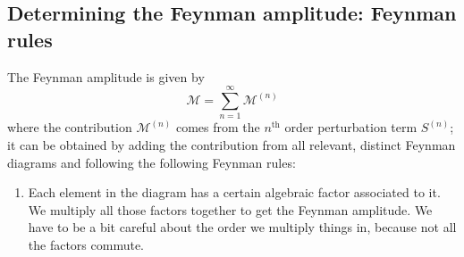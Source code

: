 \subsection{Determining the Feynman amplitude: Feynman rules}
The Feynman amplitude is given by
\[ \mathcal{M} = \sum^\infty_{n=1}\mathcal{M}^{(n)} \]
where the contribution $\mathcal{M}^{(n)}$ comes from the $n^\text{th}$ order perturbation term $S^{(n)}$; it can be obtained by adding the contribution from all relevant, distinct Feynman diagrams and following the following Feynman rules:
\begin{enumerate}
\item Each element in the diagram has a certain algebraic factor associated to it. We multiply all those factors together to get the Feynman amplitude. We have to be a bit careful about the order we multiply things in, because not all the factors commute.


\end{enumerate}
